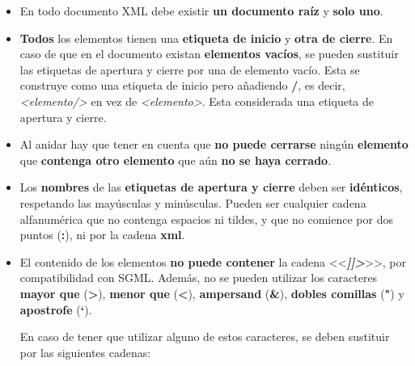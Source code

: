 \begin{itemize}
    \item En todo documento XML debe existir \textbf{un documento raíz} y \textbf{solo uno}.
    \item \textbf{Todos} los elementos tienen una \textbf{etiqueta de inicio} y \textbf{otra de cierre}. En caso de que en el documento existan \textbf{elementos vacíos}, se pueden sustituir las etiquetas de apertura y cierre por una de elemento vacío. Esta se construye como una etiqueta de inicio pero añadiendo \textbf{/}, es decir, \textit{<elemento/>} en vez de \textit{<elemento>}. Esta considerada una etiqueta de apertura y cierre.
    \item Al anidar hay que tener en cuenta que \textbf{no puede cerrarse} ningún\textbf{ elemento} que \textbf{contenga otro elemento} que aún \textbf{no se haya cerrado}.
    \item Los \textbf{nombres} de las \textbf{etiquetas de apertura y cierre} deben ser \textbf{idénticos}, respetando las mayúsculas y minúsculas. Pueden ser cualquier cadena alfanumérica que no contenga espacios ni tildes, y que no comience por dos puntos (\textbf{:}), ni por la cadena \textbf{xml}.
    \item El contenido de los elementos \textbf{no puede contener} la cadena <<\textbf{\textit{]]>}}>>, por compatibilidad con SGML. Además, no se pueden utilizar los caracteres \textbf{mayor que} (\textbf{>}), \textbf{menor que} (\textbf{<}), \textbf{ampersand} (\textbf{\&}), \textbf{dobles comillas} (\textbf{"}) y \textbf{apostrofe} (\textbf{`}).

    En caso de tener que utilizar alguno de estos caracteres, se deben sustituir por las siguientes cadenas:


\end{itemize}
